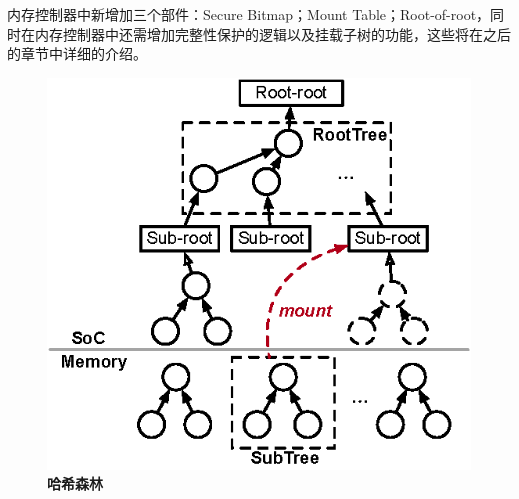 内存控制器中新增加三个部件：Secure Bitmap；Mount Table；Root-of-root，同时在内存控制器中还需增加完整性保护的逻辑以及挂载子树的功能，这些将在之后的章节中详细的介绍。

\begin{figure}[!htp]
    \centering
    \includegraphics[scale=1]{fig/design-hw-mountable-tree.eps}
    \caption{\textbf{哈希森林}}
    \label{fig:hash-forest}
  \end{figure}
